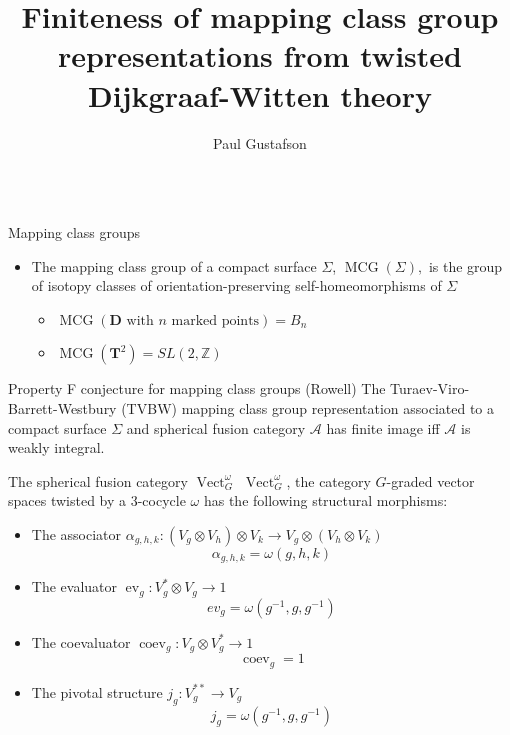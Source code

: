 \documentclass[final,t, mathserif]{beamer}
\title{\huge Finiteness of mapping class group representations from twisted Dijkgraaf-Witten theory }
\author{Paul Gustafson}
\institute{Texas A\&M University}
\DeclareMathOperator{\ev}{ev}
\DeclareMathOperator{\coev}{coev}
\DeclareMathOperator{\MCG}{MCG}
\DeclareMathOperator{\Vect}{Vect}
\theoremstyle{plain}
\theoremstyle{definition}
\begin{document}

\begin{frame}{} 
  \begin{columns}[t]
    
\begin{column}{.3\linewidth}


  \begin{block}{Mapping class groups}

    \begin{itemize}
    
\item
   The mapping class group of a compact surface $\Sigma$, 
   $\MCG(\Sigma),$
   is the group of isotopy classes of orientation-preserving self-homeomorphisms of $\Sigma$ 
  \begin{itemize}
    \item $\MCG(\mathbf{D} \text{ with } n \text{ marked points}) = B_n$
    \item $\MCG(\mathbf{T}^2) = SL(2,\mathbb Z)$
  \end{itemize}
\end{itemize}
\end{block}



\begin{block}{Property F conjecture for mapping class groups (Rowell)}
The Turaev-Viro-Barrett-Westbury (TVBW) mapping class group representation associated to a compact surface $\Sigma$ and spherical fusion category $\mathcal A$ has finite image iff $\mathcal A$ is weakly integral.
\end{block}


\begin{block}{The spherical fusion category $\Vect^\omega_G$}
   $\Vect^\omega_G$, the category $G$-graded vector spaces twisted by a 3-cocycle $\omega$ has the following structural morphisms:
\begin{itemize} 
\item The associator $\alpha_{g,h,k}:(V_g \otimes V_h) \otimes V_k \to V_g \otimes (V_h \otimes V_k)$
            $$ \alpha_{g,h,k} = \omega(g,h,k)$$
\item The evaluator $\ev_g:V_g^* \otimes V_g \to 1$
  $$ ev_g = \omega(g^{-1},g,g^{-1})$$
\item The coevaluator $\coev_g:V_g \otimes V_g^* \to 1$
    $$\coev_g = 1$$
\item The pivotal structure $j_g:V_g^{**} \to V_g$
            $$ j_g = \omega(g^{-1},g,g^{-1})$$
\end{itemize}


\end{block}
\end{column}
\end{columns}
\end{frame}
\end{document}
